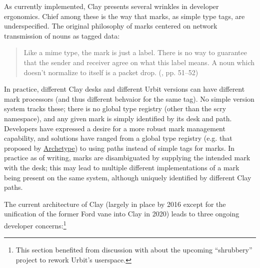 \documentclass[twoside]{article}
\begin{document}
As currently implemented, Clay presents several wrinkles in developer ergonomics.  Chief among these is the way that marks, as simple type tags, are underspecified.  The original philosophy of marks centered on network transmission of nouns as tagged data:

\begin{quote}
  Like a {\sc mime} type, the mark is just a label. There is no way to guarantee that the sender and receiver agree on what this label means.  A noun which doesn't normalize to itself is a packet drop.  (\citet{Whitepaper}, pp. 51–52)
\end{quote}

\noindent
In practice, different Clay desks and different Urbit versions can have different mark processors (and thus different behvaior for the same tag).  No simple version system tracks these; there is no global type registry (other than the scry namespace), and any given mark is simply identified by its desk and path.  Developers have expressed a desire for a more robust mark management capability, and solutions have ranged from a global type registry (e.g. that proposed by \href{https://www.archetype.computer/}{Archetype}) to using paths instead of simple tags for marks.  In practice as of writing, marks are disambiguated by supplying the intended mark with the desk; this may lead to multiple different implementations of a mark being present on the same system, although uniquely identified by different Clay paths.

The current architecture of Clay (largely in place by 2016 except for the unification of the former Ford vane into Clay in 2020) leads to three ongoing developer concerns:\footnote{This section benefited from discussion with  about the upcoming ``shrubbery'' project to rework Urbit's userspace.}
\end{document}
